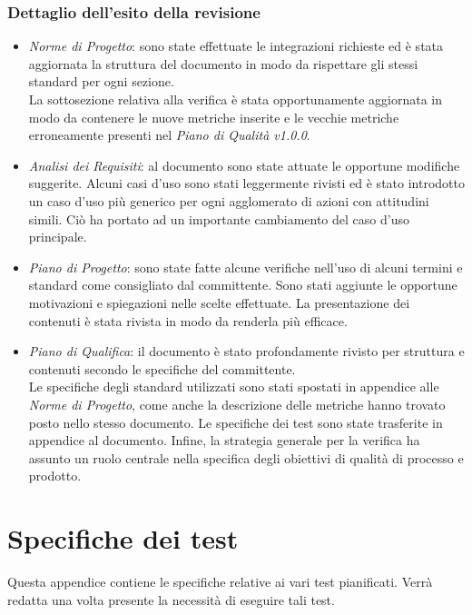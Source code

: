 \subsubsection{Dettaglio dell'esito della revisione}
\begin{itemize}
	\item\emph{Norme di Progetto}: sono state effettuate le integrazioni richieste ed è stata aggiornata la struttura del documento in modo da rispettare gli stessi standard per ogni sezione.\\
	La sottosezione relativa alla verifica è stata opportunamente aggiornata in modo da contenere le nuove metriche inserite e le vecchie metriche erroneamente presenti nel \emph{Piano di Qualità v1.0.0}.	\item\emph{Analisi dei Requisiti}: al documento sono state attuate le opportune modifiche suggerite. Alcuni casi d'uso sono stati leggermente rivisti ed è stato introdotto un caso d'uso più generico per ogni agglomerato di azioni con attitudini simili. Ciò ha portato ad un importante cambiamento del caso d'uso principale. 	
	\item\emph{Piano di Progetto}: sono state fatte alcune verifiche nell'uso di alcuni termini e standard come consigliato dal committente. Sono stati aggiunte le opportune motivazioni e spiegazioni nelle scelte effettuate. La presentazione dei contenuti è stata rivista in modo da renderla più efficace.
	\item\emph{Piano di Qualifica}: il documento è stato profondamente rivisto per struttura e contenuti secondo le specifiche del committente. \\
	Le specifiche degli standard utilizzati sono stati spostati in appendice alle \emph{Norme di Progetto}, come anche la descrizione delle metriche hanno trovato posto nello stesso documento. Le specifiche dei test sono state trasferite in appendice al documento. Infine, la strategia generale per la verifica ha assunto un ruolo centrale nella specifica degli obiettivi di qualità di processo e prodotto. 
\end{itemize}

\pagebreak

\section{Specifiche dei test}
Questa appendice contiene le specifiche relative ai vari test pianificati. Verrà redatta una volta presente la necessità di eseguire tali test.
